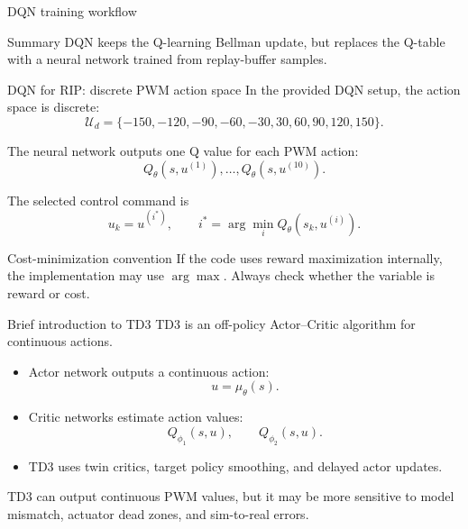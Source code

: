 \documentclass[aspectratio=169]{beamer}
\begin{document}
\begin{frame}{DQN training workflow}
\begin{center}
{\begin{tikzpicture}
\end{tikzpicture}
}
\end{center}

\vspace{0.1cm}

\begin{block}{Summary}
\small
DQN keeps the Q-learning Bellman update, but replaces the Q-table with a neural network trained from replay-buffer samples.
\end{block}

\end{frame}


\begin{frame}{DQN for RIP: discrete PWM action space}
In the provided DQN setup, the action space is discrete:
\[
\mathcal U_d=
\{-150,-120,-90,-60,-30,30,60,90,120,150\}.
\]


The neural network outputs one Q value for each PWM action:
\[
Q_\theta(s,u^{(1)}),\ldots,Q_\theta(s,u^{(10)}).
\]


The selected control command is
\[
u_k=u^{(i^*)},
\qquad
 i^*=\arg\min_i Q_\theta(s_k,u^{(i)}).
\]

\begin{alertblock}{Cost-minimization convention}
\small
If the code uses reward maximization internally, the implementation may use \(\arg\max\). Always check whether the variable is reward or cost.
\end{alertblock}
\end{frame}

\begin{frame}{Brief introduction to TD3}
TD3 is an off-policy Actor--Critic algorithm for continuous actions.

\vspace{0.2cm}
\begin{itemize}
    \item Actor network outputs a continuous action:
    \[
    u=\mu_\theta(s).
    \]

    \item Critic networks estimate action values:
    \[
    Q_{\phi_1}(s,u),\qquad Q_{\phi_2}(s,u).
    \]
 
    \item TD3 uses twin critics, target policy smoothing, and delayed actor updates.
\end{itemize}


TD3 can output continuous PWM values, but it may be more sensitive to model mismatch, actuator dead zones, and sim-to-real errors.

\end{frame}
\end{document}
